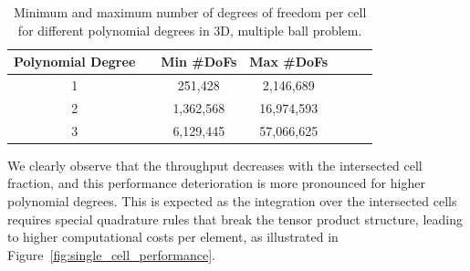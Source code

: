 \documentclass[11pt,a4paper]{article}
\begin{document}
\begin{table}[!ht]
    \centering
    \caption{Minimum and maximum number of degrees of freedom per cell for different polynomial degrees in 3D,
        multiple ball problem.}
    \begin{tabular}{c |c c c c c c}
        Polynomial Degree &  & Min \#DoFs & Max \#DoFs \\ \hline 1 & & 251,428 & 2,146,689 \\ 2 & & 1,362,568 & 16,974,593 \\ 3
                          &  & 6,129,445  & 57,066,625 \\
    \end{tabular}

    \label{tab:dofs_per_cell}
\end{table}

We clearly observe that the throughput decreases with the intersected cell fraction, and this performance deterioration
is more pronounced for higher polynomial degrees. This is expected as the integration over the intersected cells
requires special quadrature rules that break the tensor product structure, leading to higher computational costs per
element, as illustrated in Figure~\ref{fig:single_cell_performance}.
\end{document}
